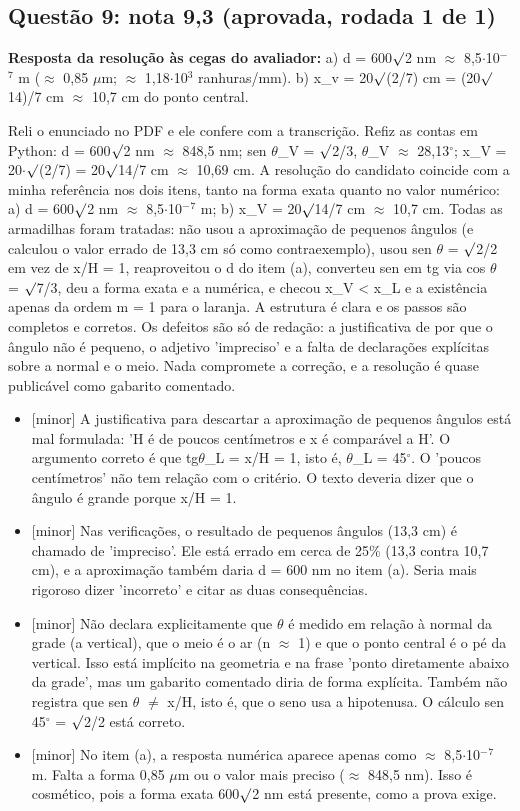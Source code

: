 \documentclass{article}%
\begin{document}
\subsection*{Questão 9: nota 9,3 (aprovada, rodada 1 de 1)}%
\textbf{Resposta da resolução às cegas do avaliador:} a) d = 600$\surd$2 nm $\approx$ 8,5$\cdot$10$^{-}$$^{7}$ m ($\approx$ 0,85 $\mu$m; $\approx$ 1,18$\cdot$10$^3$ ranhuras/mm).\newline%
b) x\_v = 20$\surd$(2/7) cm = (20$\surd$14)/7 cm $\approx$ 10,7 cm do ponto central.\par %
Reli o enunciado no PDF e ele confere com a transcrição. Refiz as contas em Python: d = 600$\surd$2 nm $\approx$ 848,5 nm; sen $\theta$\_V = $\surd$2/3, $\theta$\_V $\approx$ 28,13$^\circ$; x\_V = 20$\cdot$$\surd$(2/7) = 20$\surd$14/7 cm $\approx$ 10,69 cm. A resolução do candidato coincide com a minha referência nos dois itens, tanto na forma exata quanto no valor numérico: a) d = 600$\surd$2 nm $\approx$ 8,5$\cdot$10$^{-}$$^{7}$ m; b) x\_V = 20$\surd$14/7 cm $\approx$ 10,7 cm. Todas as armadilhas foram tratadas: não usou a aproximação de pequenos ângulos (e calculou o valor errado de 13,3 cm só como contraexemplo), usou sen $\theta$ = $\surd$2/2 em vez de x/H = 1, reaproveitou o d do item (a), converteu sen em tg via cos $\theta$ = $\surd$7/3, deu a forma exata e a numérica, e checou x\_V < x\_L e a existência apenas da ordem m = 1 para o laranja. A estrutura é clara e os passos são completos e corretos. Os defeitos são só de redação: a justificativa de por que o ângulo não é pequeno, o adjetivo 'impreciso' e a falta de declarações explícitas sobre a normal e o meio. Nada compromete a correção, e a resolução é quase publicável como gabarito comentado.%
\begin{itemize}%
\item%
{[}minor{]} A justificativa para descartar a aproximação de pequenos ângulos está mal formulada: 'H é de poucos centímetros e x é comparável a H'. O argumento correto é que tg$\theta$\_L = x/H = 1, isto é, $\theta$\_L = 45$^\circ$. O 'poucos centímetros' não tem relação com o critério. O texto deveria dizer que o ângulo é grande porque x/H = 1.%
\item%
{[}minor{]} Nas verificações, o resultado de pequenos ângulos (13,3 cm) é chamado de 'impreciso'. Ele está errado em cerca de 25\% (13,3 contra 10,7 cm), e a aproximação também daria d = 600 nm no item (a). Seria mais rigoroso dizer 'incorreto' e citar as duas consequências.%
\item%
{[}minor{]} Não declara explicitamente que $\theta$ é medido em relação à normal da grade (a vertical), que o meio é o ar (n $\approx$ 1) e que o ponto central é o pé da vertical. Isso está implícito na geometria e na frase 'ponto diretamente abaixo da grade', mas um gabarito comentado diria de forma explícita. Também não registra que sen $\theta$ $\neq$ x/H, isto é, que o seno usa a hipotenusa. O cálculo sen 45$^\circ$ = $\surd$2/2 está correto.%
\item%
{[}minor{]} No item (a), a resposta numérica aparece apenas como $\approx$ 8,5$\cdot$10$^{-}$$^{7}$ m. Falta a forma 0,85 $\mu$m ou o valor mais preciso ($\approx$ 848,5 nm). Isso é cosmético, pois a forma exata 600$\surd$2 nm está presente, como a prova exige.%
\end{itemize}%
\end{document}
